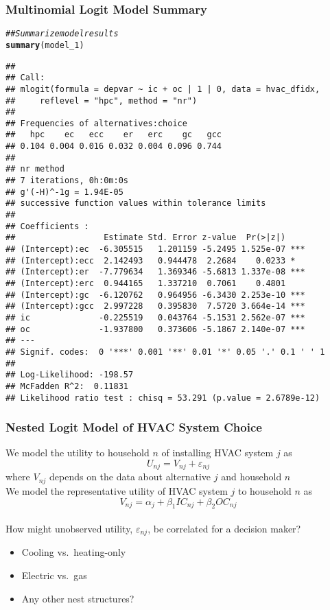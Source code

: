 \documentclass{beamer}\usepackage[]{graphicx}\usepackage[]{xcolor}
\makeatletter
\newcommand{\hlcom}[1]{\textcolor[rgb]{0.678,0.584,0.686}{\textit{#1}}}%
\newcommand{\hlstd}[1]{\textcolor[rgb]{0.345,0.345,0.345}{#1}}%
\newcommand{\hlkwd}[1]{\textcolor[rgb]{0.737,0.353,0.396}{\textbf{#1}}}%
\newenvironment{kframe}{%
 \def\at@end@of@kframe{}%
 \ifinner\ifhmode%
  \def\at@end@of@kframe{\end{minipage}}%
  \begin{minipage}{\columnwidth}%
 \fi\fi%
 \def\FrameCommand##1{\hskip\@totalleftmargin \hskip-\fboxsep
 \colorbox{shadecolor}{##1}\hskip-\fboxsep
     \hskip-\linewidth \hskip-\@totalleftmargin \hskip\columnwidth}%
 \MakeFramed {\advance\hsize-\width
   \@totalleftmargin\z@ \linewidth\hsize
   \@setminipage}}%
 {\par\unskip\endMakeFramed%
 \at@end@of@kframe}
\newenvironment{knitrout}{}{} %
\makeatother
\begin{document}
\begin{frame}[fragile]\frametitle{Multinomial Logit Model Summary}
\begin{knitrout}\tiny
{}\color{fgcolor}\begin{kframe}
\begin{alltt}
\hlcom{## Summarize model results}
\hlkwd{summary}\hlstd{(model_1)}
\end{alltt}
\begin{verbatim}
## 
## Call:
## mlogit(formula = depvar ~ ic + oc | 1 | 0, data = hvac_dfidx, 
##     reflevel = "hpc", method = "nr")
## 
## Frequencies of alternatives:choice
##   hpc    ec   ecc    er   erc    gc   gcc 
## 0.104 0.004 0.016 0.032 0.004 0.096 0.744 
## 
## nr method
## 7 iterations, 0h:0m:0s 
## g'(-H)^-1g = 1.94E-05 
## successive function values within tolerance limits 
## 
## Coefficients :
##                  Estimate Std. Error z-value  Pr(>|z|)    
## (Intercept):ec  -6.305515   1.201159 -5.2495 1.525e-07 ***
## (Intercept):ecc  2.142493   0.944478  2.2684    0.0233 *  
## (Intercept):er  -7.779634   1.369346 -5.6813 1.337e-08 ***
## (Intercept):erc  0.944165   1.337210  0.7061    0.4801    
## (Intercept):gc  -6.120762   0.964956 -6.3430 2.253e-10 ***
## (Intercept):gcc  2.997228   0.395830  7.5720 3.664e-14 ***
## ic              -0.225519   0.043764 -5.1531 2.562e-07 ***
## oc              -1.937800   0.373606 -5.1867 2.140e-07 ***
## ---
## Signif. codes:  0 '***' 0.001 '**' 0.01 '*' 0.05 '.' 0.1 ' ' 1
## 
## Log-Likelihood: -198.57
## McFadden R^2:  0.11831 
## Likelihood ratio test : chisq = 53.291 (p.value = 2.6789e-12)
\end{verbatim}
\end{kframe}
\end{knitrout}
\end{frame}

\begin{frame}\frametitle{Nested Logit Model of HVAC System Choice}
    We model the utility to household $n$ of installing HVAC system $j$ as
    $$U_{nj} = V_{nj} + \varepsilon_{nj}$$
    where $V_{nj}$ depends on the data about alternative $j$ and household $n$ \\
    \vspace{3ex}
    We model the representative utility of HVAC system $j$ to household $n$ as
    $$V_{nj} = \alpha_j + \beta_1 IC_{nj} + \beta_2 OC_{nj}$$ \\
    \vspace{2ex}
    How might unobserved utility, $\varepsilon_{nj}$, be correlated for a decision maker?
    \begin{itemize}
    	\item Cooling vs.\ heating-only
    	\item Electric vs.\ gas
    	\item Any other nest structures?
    \end{itemize}
\end{frame}
\end{document}
